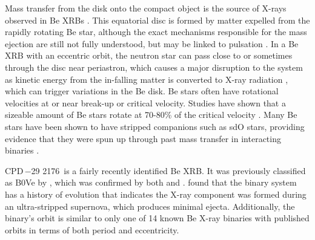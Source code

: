 \documentclass[]{aastex631}
\newcommand{\target}{CPD\,$-$29 2176}
\begin{document}
Mass transfer from the disk onto the compact object is the source of X-rays observed in Be XRBs \citep{P.Reig2016}. This equatorial disc is formed by matter expelled from the rapidly rotating Be star, although the exact mechanisms responsible for the mass ejection are still not fully understood, but may be linked to pulsation \citep[e.g., ][]{1998ASPC..135..343R, 2018A&A...610A..70B, 2021MNRAS.508.2002R}. In a Be XRB with an eccentric orbit, the neutron star can pass close to or sometimes through the disc near periastron, which causes a major disruption to the system as kinetic energy from the in-falling matter is converted to X-ray radiation \citep{Reig2011}, which can trigger variations in the Be disk. 
Be stars often have rotational velocities at or near break-up or critical velocity. Studies have shown that a sizeable amount of Be stars rotate at 70-80\% of the critical velocity \citep{Biswajit2011}. Many Be stars have been shown to have stripped companions such as sdO stars, providing evidence that they were spun up through past mass transfer in interacting binaries \citep[e.g.,][, and references therein]{2018ApJ...853..156W, 2021AJ....161..248W}.

\target\ is a fairly recently identified Be XRB. It was previously classified as B0Ve by \citet{1966AJ.....71..999F}, which was confirmed by both \citet{1983MNRAS.205..241R} and \citet{1993ApJS...89..293V}. \citet{noel} found that the binary system has a history of evolution that indicates the X-ray component was formed during an ultra-stripped supernova, which produces minimal ejecta. Additionally, the binary's orbit is similar to only one of 14 known Be X-ray binaries with published orbits in terms of both period and eccentricity.
\end{document}
